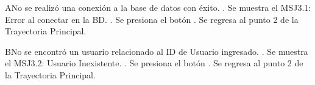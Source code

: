 		\begin{UCtrayectoriaA}{A}{No se realizó una conexión a la base de datos con éxito.}
			.	Se muestra el MSJ3.1: Error al conectar en la BD. 
			. Se presiona el botón 
			.	Se regresa al punto 2 de la Trayectoria Principal.
		\end{UCtrayectoriaA}


	
		\begin{UCtrayectoriaA}{B}{No se encontró un usuario relacionado al ID de Usuario ingresado.}
			.	Se muestra el MSJ3.2: Usuario Inexistente. 
			. Se presiona el botón 			
			.	Se regresa al punto 2 de la Trayectoria Principal.
		\end{UCtrayectoriaA}
		
